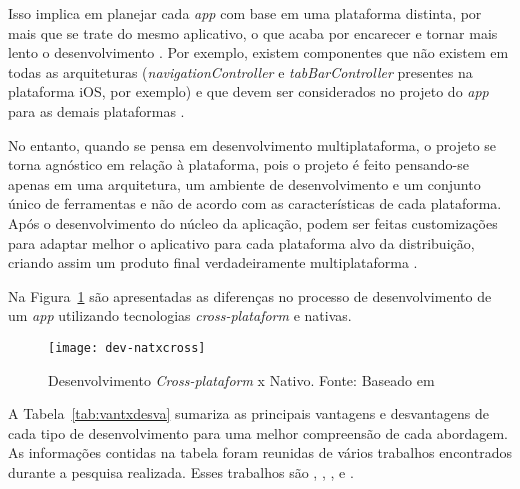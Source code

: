 Isso implica em planejar cada \textit{app} com base em uma plataforma distinta, por mais que se trate do mesmo aplicativo, o que acaba por encarecer 
e tornar mais lento o desenvolvimento \cite{kassas_taxonomy_2015}. Por exemplo, existem componentes que não existem em todas as arquiteturas (\textit{navigationController} e 
\textit{tabBarController} presentes na plataforma iOS, por exemplo) e que devem ser considerados no projeto do \textit{app} para as demais plataformas \cite{shakshuki_4th_2013}.

No entanto, quando se pensa em desenvolvimento multiplataforma, o projeto se torna agnóstico em relação à plataforma, pois o projeto é feito pensando-se 
apenas em uma arquitetura, um ambiente de desenvolvimento e um conjunto único de ferramentas e não de acordo com as características de cada plataforma. Após o desenvolvimento do núcleo da
aplicação, podem ser feitas customizações para adaptar melhor o aplicativo para cada plataforma alvo da distribuição, criando assim um produto final verdadeiramente multiplataforma \cite{corral_ant_2012}.

Na Figura~\ref{fig:dev-natxcross} são apresentadas as diferenças no processo de desenvolvimento de um \textit{app} utilizando tecnologias \textit{cross-plataform} e 
nativas.

\begin{figure}[H]
  \centering
    \texttt{[image: dev-natxcross]}
    \caption[Desenvolvimento \textit{Cross-plataform} x Nativo]{ Desenvolvimento \textit{Cross-plataform} x Nativo. Fonte: Baseado em \cite{corral_ant_2012}}
	\label{fig:dev-natxcross}
\end{figure}

A Tabela~\ref{tab:vantxdesva} sumariza as principais vantagens e desvantagens de cada tipo de desenvolvimento para uma melhor compreensão de cada abordagem. 
As informações contidas na tabela foram reunidas de vários trabalhos encontrados durante a pesquisa realizada. Esses trabalhos são , 
, ,  e . 

